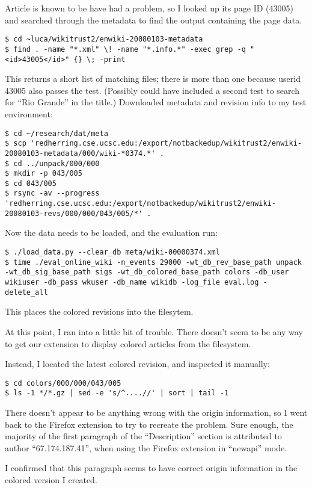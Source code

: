 Article  is known to be have had a problem,
so I looked up its page ID (43005) and searched through the
metadata to find the  output containing
the page data.
\begin{verbatim}
$ cd ~luca/wikitrust2/enwiki-20080103-metadata
$ find . -name "*.xml" \! -name "*.info.*" -exec grep -q "<id>43005</id>" {} \; -print
\end{verbatim}
This returns a short list of matching files; there
is more than one because userid 43005 also passes the  test.
(Possibly could have included a second  test
to search for ``Rio Grande'' in the title.)
Downloaded metadata and revision info to my test environment:
\begin{verbatim}
$ cd ~/research/dat/meta
$ scp 'redherring.cse.ucsc.edu:/export/notbackedup/wikitrust2/enwiki-20080103-metadata/000/wiki-*0374.*' .
$ cd ../unpack/000/000
$ mkdir -p 043/005
$ cd 043/005
$ rsync -av --progress 'redherring.cse.ucsc.edu:/export/notbackedup/wikitrust2/enwiki-20080103-revs/000/000/043/005/*' .
\end{verbatim}


Now the data needs to be loaded, and the evaluation run:
\begin{verbatim}
$ ./load_data.py --clear_db meta/wiki-00000374.xml
$ time ./eval_online_wiki -n_events 29000 -wt_db_rev_base_path unpack -wt_db_sig_base_path sigs -wt_db_colored_base_path colors -db_user wikiuser -db_pass wkuser -db_name wikidb -log_file eval.log -delete_all
\end{verbatim}
This places the colored revisions into the filesytem.


At this point, I ran into a little bit of trouble.
There doesn't seem to be any way to get our extension to
display colored articles from the filesystem.

Instead, I located the latest colored revision, and
inspected it manually:
\begin{verbatim}
$ cd colors/000/000/043/005
$ ls -1 */*.gz | sed -e 's/^....//' | sort | tail -1
\end{verbatim}
There doesn't appear to be anything wrong with the origin
information, so I went back to the Firefox extension to
try to recreate the problem.
Sure enough, the majority of the first paragraph of the ``Description''
section is attributed to author ``67.174.187.41'', when using
the Firefox extension in ``newapi'' mode.

I confirmed that this paragraph seems to have correct origin
information in the colored version I created.

